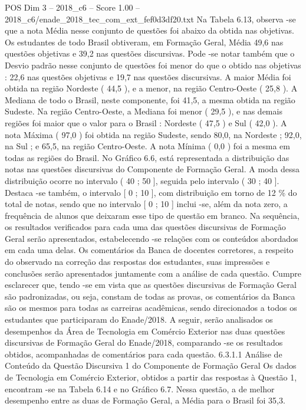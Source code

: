 \begin{textsample}{POS Dim 3 – 2018\_c6 – Score 1.00 – 2018\_c6/enade\_2018\_tec\_com\_ext\_fef0d3df20.txt}
Na Tabela 6.13, observa -se que a nota Média nesse conjunto de questões foi abaixo da obtida nas objetivas.
Os estudantes de todo Brasil obtiveram, em Formação Geral, Média 49,6 nas questões objetivas e 39,2 nas questões discursivas.
Pode -se notar também que o Desvio padrão nesse conjunto de questões foi menor do que o obtido nas objetivas : 22,6 nas questões objetivas e 19,7 nas questões discursivas.
A maior Média foi obtida na região Nordeste ( 44,5 ), e a menor, na região Centro-Oeste ( 25,8 ).
A Mediana de todo o Brasil, neste componente, foi 41,5, a mesma obtida na região Sudeste.
Na região Centro-Oeste, a Mediana foi menor ( 29,5 ), e nas demais regiões foi maior que o valor para o Brasil : Nordeste ( 47,5 ) e Sul ( 42,0 ).
A nota Máxima ( 97,0 ) foi obtida na região Sudeste, sendo 80,0, na Nordeste ; 92,0, na Sul ; e 65,5, na região Centro-Oeste.
A nota Mínima ( 0,0 ) foi a mesma em todas as regiões do Brasil.
No Gráfico 6.6, está representada a distribuição das notas nas questões discursivas do Componente de Formação Geral.
A moda dessa distribuição ocorre no intervalo ( 40 ; 50 ], seguida pelo intervalo ( 30 ; 40 ].
Destaca -se também, o intervalo [ 0 ; 10 ], com distribuição em torno de 12 \% do total de notas, sendo que no intervalo [ 0 ; 10 ] inclui -se, além da nota zero, a frequência de alunos que deixaram esse tipo de questão em branco.
Na sequência, os resultados verificados para cada uma das questões discursivas de Formação Geral serão apresentados, estabelecendo -se relações com os conteúdos abordados em cada uma delas.
Os comentários da Banca de docentes corretores, a respeito do observado na correção das respostas dos estudantes, suas impressões e conclusões serão apresentados juntamente com a análise de cada questão.
Cumpre esclarecer que, tendo -se em vista que as questões discursivas de Formação Geral são padronizadas, ou seja, constam de todas as provas, os comentários da Banca são os mesmos para todas as carreiras acadêmicas, sendo direcionados a todos os estudantes que participaram do Enade/2018.
A seguir, serão analisados os desempenhos da Área de Tecnologia em Comércio Exterior nas duas questões discursivas de Formação Geral do Enade/2018, comparando -se os resultados obtidos, acompanhadas de comentários para cada questão. 6.3.1.1 Análise de Conteúdo da Questão Discursiva 1 do Componente de Formação Geral Os dados de Tecnologia em Comércio Exterior, obtidos a partir das respostas à Questão 1, encontram -se na Tabela 6.14 e no Gráfico 6.7.
Nessa questão, a de melhor desempenho entre as duas de Formação Geral, a Média para o Brasil foi 35,3.

\end{textsample}
